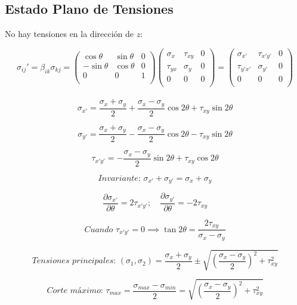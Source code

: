 \documentclass[a4paper,12pt,twoside,final,spanish]{article}
\begin{document}
\subsection*{Estado Plano de Tensiones}

No hay tensiones en la dirección de $z$:

\[
\sigma_{ij}'=\beta_{ik}\sigma_{kj}=
\left(\begin{matrix}
\cos\theta & \sin\theta & 0\\
-\sin\theta & \cos\theta & 0\\
0 & 0 & 1\\
\end{matrix}\right)
\left(\begin{matrix}
\sigma_{x} & \tau_{xy} & 0\\
\tau_{yx} & \sigma_{y} & 0\\
0 & 0 & 0\\
\end{matrix}\right)=
\left(\begin{matrix}
\sigma_{x'} & \tau_{x'y'} & 0\\
\tau_{y'x'} & \sigma_{y'} & 0\\
0 & 0 & 0\\
\end{matrix}\right)
\]
\\
\[
\sigma_{x'}=\frac{\sigma_{x}+\sigma_{y}}{2}+\frac{\sigma_{x}-\sigma_{y}}{2}\cos{2\theta}+\tau_{xy}\sin{2\theta}
\]

\[
\sigma_{y'}=\frac{\sigma_{x}+\sigma_{y}}{2}-\frac{\sigma_{x}-\sigma_{y}}{2}\cos{2\theta}-\tau_{xy}\sin{2\theta}
\]

\[
\tau_{x'y'}=-\frac{\sigma_{x}-\sigma_{y}}{2}\sin{2\theta}+\tau_{xy}\cos{2\theta}
\]

\[
\textit{Invariante: }\sigma_{x'}+\sigma_{y'}=\sigma_{x}+\sigma_{y}
\]

\[
\frac{\partial\sigma_{x'}}{\partial\theta}=2\tau_{x'y'};\quad\frac{\partial\sigma_{y'}}{\partial\theta}=-2\tau_{xy}
\]

\[
\textit{Cuando }\tau_{x'y'}=0\implies\tan{2\theta}=\frac{2\tau_{xy}}{\sigma_{x}-\sigma_{y}}
\]

\[
\textit{Tensiones principales: }(\sigma_{1},\sigma_{2})=\frac{\sigma_{x}+\sigma_{y}}{2}\pm\sqrt{\left(\frac{\sigma_{x}-\sigma_{y}}{2}\right)^{2}+\tau_{xy}^{2}}
\]

\[
\textit{Corte máximo: }\tau_{max}=\frac{\sigma_{max}-\sigma_{min}}{2}=\sqrt{\left(\frac{\sigma_{x}-\sigma_{y}}{2}\right)^{2}+\tau_{xy}^{2}}
\]
\end{document}
